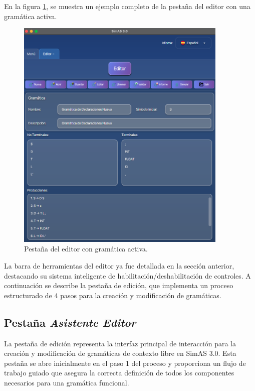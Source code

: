 En la figura \ref{fig:d3}, se muestra un ejemplo completo de la pestaña del editor con una gramática activa.

\needspace{8cm}
\begin{figure}[H]
\centering
\includegraphics[width=0.9\textwidth]{figuras2/ejemplo_practico/editor.png}
\caption{Pestaña del editor con gramática activa.}
\label{fig:d3}
\end{figure}

La barra de herramientas del editor ya fue detallada en la sección anterior, destacando su sistema inteligente de habilitación/deshabilitación de controles. A continuación se describe la pestaña de edición, que implementa un proceso estructurado de 4 pasos para la creación y modificación de gramáticas.

\subsection{Pestaña \textit{Asistente Editor}}

La pestaña de edición representa la interfaz principal de interacción para la creación y modificación de gramáticas de contexto libre en SimAS 3.0. Esta pestaña se abre inicialmente en el paso 1 del proceso y proporciona un flujo de trabajo guiado que asegura la correcta definición de todos los componentes necesarios para una gramática funcional.

